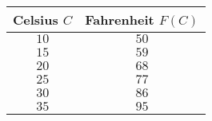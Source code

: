 \begin{tabular}{cc} \toprule
Celsius $C$  & Fahrenheit $F(C)$ \\\midrule
$10$ & $50$ \\[6pt]
$15$ & $59$ \\[6pt]
$20$ & $68$ \\[6pt]
$25$ & $77$ \\[6pt]
$30$ & $86$ \\[6pt]
$35$ & $95$ \\\bottomrule
\end{tabular}

